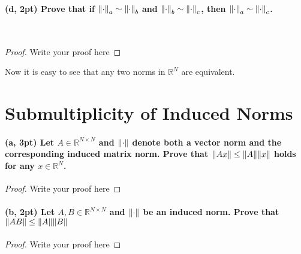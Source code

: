 \documentclass[11pt]{article}
\newcommand{\R}{\mathbb{R}}
\begin{document}
\paragraph{(d, 2pt) Prove that if $\norm{\cdot}_a \sim \norm{\cdot}_b$ and $\norm{\cdot}_b \sim \norm{\cdot}_c$, then $\norm{\cdot}_a \sim \norm{\cdot}_c$.} \mbox{}\\
\begin{proof}
  Write your proof here
\end{proof}

Now it is easy to see that any two norms in $\R^N$ are equivalent.

\section{Submultiplicity of Induced Norms}
\paragraph{(a, 3pt) Let $A \in \R^{N\times N}$ and $\norm{\cdot}$ denote both a vector norm and the corresponding induced matrix norm. Prove that $\norm{A x} \leq \norm{A} \norm{x}$ holds for any $x \in \R^N$.} 
\begin{proof}
  Write your proof here
\end{proof}

\paragraph{(b, 2pt) Let $A, B \in \R^{N\times N}$ and $\norm{\cdot}$ be an induced norm. Prove that $\norm{AB} \leq \norm{A} \norm{B}$}
\begin{proof}
  Write your proof here
\end{proof}
\end{document}
